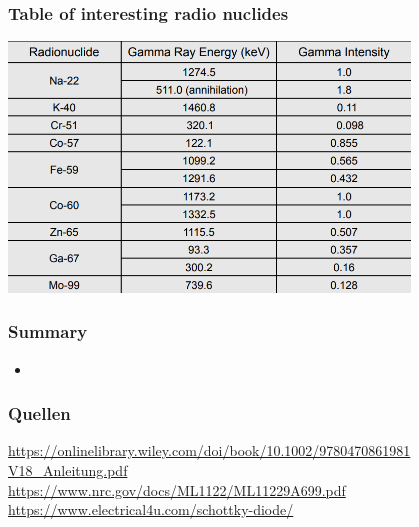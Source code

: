 \documentclass[aspectratio=1610, 9pt]{beamer}
\begin{document}
\begin{frame}\frametitle{Table of interesting radio nuclides}
  \includegraphics[width=0.8\textwidth]{plots/nuclid_table1.png}
\end{frame}

\begin{frame}\frametitle{Summary}
  \begin{itemize}
    \item
  \end{itemize}
\end{frame}

\begin{frame}\frametitle{Quellen}
\url{https://onlinelibrary.wiley.com/doi/book/10.1002/9780470861981} \\
\url{V18_Anleitung.pdf} \\
\url{https://www.nrc.gov/docs/ML1122/ML11229A699.pdf} \\
\url{https://www.electrical4u.com/schottky-diode/} \\
\end{frame}
\end{document}
